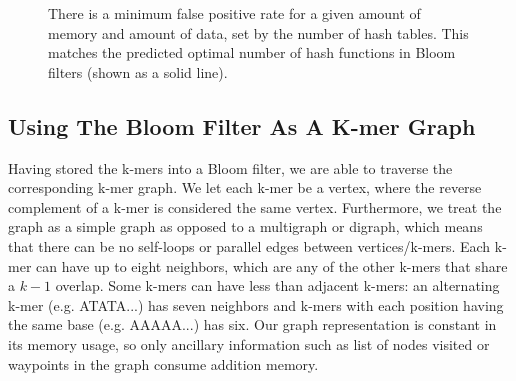 \documentclass[12pt]{article} \usepackage{simplemargins}
\begin{document}
\begin{figure}
\caption{There is a minimum false positive rate for a given amount of memory
and amount of data, set by the number of hash tables. This matches the predicted optimal 
number of hash functions in Bloom filters (shown as a solid line).}
\end{figure}

\subsection{Using The Bloom Filter As A K-mer Graph}
Having stored the k-mers into a Bloom filter, we are able to traverse
the corresponding k-mer graph. We let each k-mer be a vertex, where
the reverse complement of a k-mer is considered the same
vertex. Furthermore, we treat the graph as a simple graph as opposed
to a multigraph or digraph, which means that there can be no
self-loops or parallel edges between vertices/k-mers. Each k-mer can
have up to eight neighbors, which are any of the other k-mers that
 share a $k-1$ 
overlap. Some k-mers can have less than adjacent k-mers: an alternating k-mer
(e.g. ATATA...) has seven neighbors and k-mers with each position
having the same base (e.g. AAAAA...) has six. Our graph representation is 
constant in its memory usage, so only ancillary information such as list of 
nodes visited or waypoints in the graph consume addition memory. 
\end{document}
